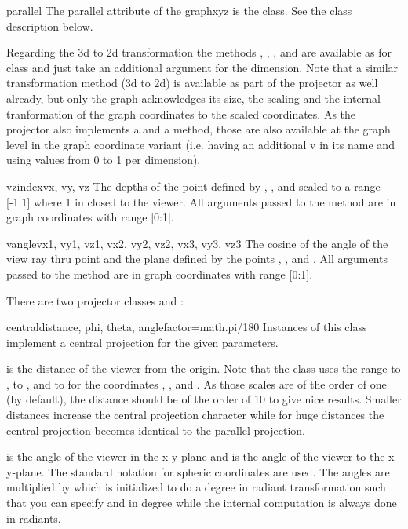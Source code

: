 \begin{memberdesc}{parallel}
  The parallel attribute of the graphxyz is the  class.
  See the class description below.
\end{memberdesc}

Regarding the 3d to 2d transformation the methods ,
, , and  are
available as for class  and just take an additional
argument for the dimension. Note that a similar transformation method
(3d to 2d) is available as part of the projector as well already, but
only the graph acknowledges its size, the scaling and the internal
tranformation of the graph coordinates to the scaled coordinates. As
the projector also implements a  and a 
method, those are also available at the graph level in the graph
coordinate variant (i.e. having an additional v in its name and using
values from 0 to 1 per dimension).

\begin{methoddesc}{vzindex}{vx, vy, vz}
  The depths of the point defined by , , and 
  scaled to a range [-1:1] where 1 in closed to the viewer. All
  arguments passed to the method are in graph coordinates with range
  [0:1].
\end{methoddesc}

\begin{methoddesc}{vangle}{vx1, vy1, vz1, vx2, vy2, vz2, vx3, vy3, vz3}
  The cosine of the angle of the view ray thru point  and the plane defined by the points ,
  , and . All arguments
  passed to the method are in graph coordinates with range [0:1].
\end{methoddesc}

There are two projector classes  and :

\begin{classdesc}{central}{distance, phi, theta, anglefactor=math.pi/180}
  Instances of this class implement a central projection for the given
  parameters.

   is the distance of the viewer from the origin. Note
  that the  class uses the range  to
  ,  to , and 
  to  for the coordinates , , and
  . As those scales are of the order of one (by default), the
  distance should be of the order of 10 to give nice results. Smaller
  distances increase the central projection character while for huge
  distances the central projection becomes identical to the parallel
  projection.

   is the angle of the viewer in the x-y-plane and
   is the angle of the viewer to the x-y-plane. The
  standard notation for spheric coordinates are used. The angles are
  multiplied by  which is initialized to do a degree
  in radiant transformation such that you can specify  and
   in degree while the internal computation is always done
  in radiants.
\end{classdesc}

